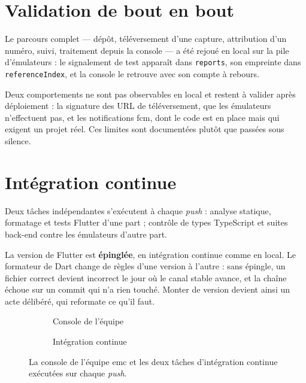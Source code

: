 \documentclass[11pt,a4paper,oneside,openany]{report}
\begin{document}
\section{Validation de bout en bout}

Le parcours complet — dépôt, téléversement d'une capture, attribution d'un numéro,
suivi, traitement depuis la console — a été rejoué en local sur la pile
d'émulateurs : le signalement de test apparaît dans \texttt{reports}, son empreinte
dans \texttt{referenceIndex}, et la console le retrouve avec son compte à rebours.

\begin{vigilance}
\small
Deux comportements ne sont pas observables en local et restent à valider après
déploiement : la signature des URL de téléversement, que les émulateurs
n'effectuent pas, et les notifications \gls{fcm}, dont le code est en place mais
qui exigent un projet réel. Ces limites sont documentées plutôt que passées sous
silence.
\end{vigilance}

\section{Intégration continue}

Deux tâches indépendantes s'exécutent à chaque \emph{push} : analyse statique,
formatage et tests Flutter d'une part ; contrôle de types TypeScript et suites
back-end contre les émulateurs d'autre part.

\begin{decision}
\small
La version de Flutter est \textbf{épinglée}, en intégration continue comme en
local. Le formateur de Dart change de règles d'une version à l'autre : sans
épingle, un fichier correct devient incorrect le jour où le canal stable avance,
et la chaîne échoue sur un commit qui n'a rien touché. Monter de version devient
ainsi un acte délibéré, qui reformate ce qu'il faut.
\end{decision}

\begin{figure}[htbp]
\centering
\begin{subfigure}[b]{0.455\textwidth}\centering
  \caption{Console de l'équipe}\end{subfigure}\hfill
\begin{subfigure}[b]{0.455\textwidth}\centering
  \caption{Intégration continue}\end{subfigure}
\caption[Console de traitement et intégration continue]{La console de l'équipe
\gls{emc} et les deux tâches d'intégration continue exécutées sur chaque \emph{push}.}
\label{fig:validation}
\end{figure}
\end{document}
